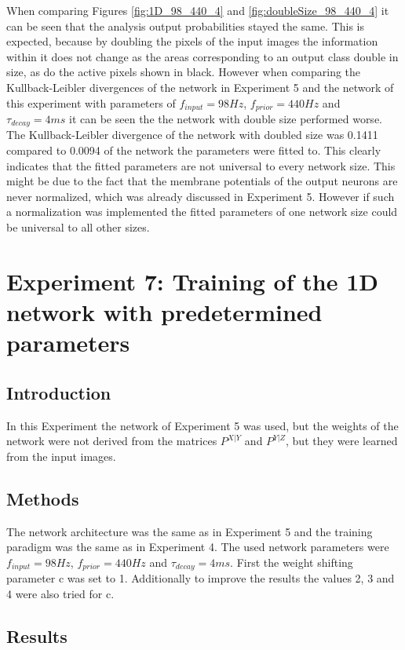 When comparing Figures \ref{fig:1D_98_440_4} and \ref{fig:doubleSize_98_440_4} it can be seen that the analysis output probabilities stayed the same. This is expected, because by doubling the pixels of the input images the information within it does not change as the areas corresponding to an output class double in size, as do the active pixels shown in black. However when comparing the Kullback-Leibler divergences of the network in Experiment 5 and the network of this experiment with parameters of $f_{input} = 98 Hz$, $f_{prior} = 440 Hz$ and $\tau_{decay} = 4 ms$ it can be seen the the network with double size performed worse. The Kullback-Leibler divergence of the network with doubled size was 0.1411 compared to 0.0094 of the network the parameters were fitted to. This clearly indicates that the fitted parameters are not universal to every network size. This might be due to the fact that the membrane potentials of the output neurons are never normalized, which was already discussed in Experiment 5. However if such a normalization was implemented the fitted parameters of one network size could be universal to all other sizes.

\section{Experiment 7: Training of the 1D network with predetermined parameters}
\label{section:1DPreDetermined}

\subsection{Introduction}

In this Experiment the network of Experiment 5 was used, but the weights of the network were not derived from the matrices $P^{X|Y}$ and $P^{Y|Z}$, but they were learned from the input images.

\subsection{Methods}

The network architecture was the same as in Experiment 5 and the training paradigm was the same as in Experiment 4. The used network parameters were $f_{input} = 98 Hz$, $f_{prior} = 440 Hz$ and $\tau_{decay} = 4 ms$. First the weight shifting parameter c was set to 1. Additionally to improve the results the values 2, 3 and 4 were also tried for c.

\subsection{Results}

